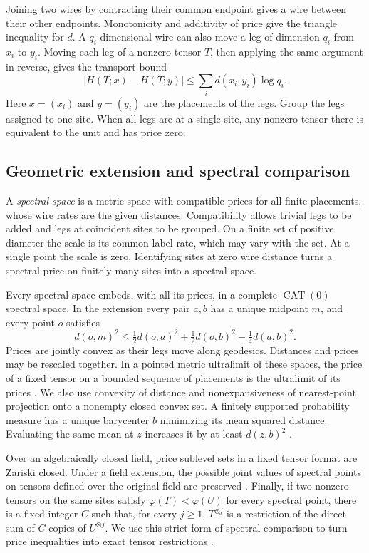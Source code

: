 Joining two wires by contracting their common endpoint gives a wire
between their other endpoints. Monotonicity and additivity of price
give the triangle inequality for \(d\). A \(q_i\)-dimensional wire
can also move a leg of dimension \(q_i\) from \(x_i\) to \(y_i\).
Moving each leg of a nonzero tensor \(T\), then applying the same
argument in reverse, gives the transport bound
\begin{equation}\label{eq:prices-transport}
       |H(T;x)-H(T;y)|\le\sum_i d(x_i,y_i)\log q_i .
\end{equation}
Here \(x=(x_i)\) and \(y=(y_i)\) are the placements of the legs. Group
the legs assigned to one site. When all legs are at a single site, any
nonzero tensor there is equivalent to the unit and has price zero.

\subsection{Geometric extension and spectral comparison}
A \emph{spectral space} is a metric space with compatible prices for
all finite placements, whose wire rates are the given distances.
Compatibility allows trivial legs to be added and legs at coincident
sites to be grouped. On a finite set of positive diameter the scale is
its common-label rate, which may vary with the set. At a single point the
scale is zero. Identifying sites at zero wire distance turns a spectral
price on finitely many sites into a spectral space.

Every spectral space embeds, with all its prices, in a complete
\(\operatorname{CAT}(0)\) spectral space. In the extension every pair
\(a,b\) has a unique midpoint \(m\), and every point \(o\) satisfies
\[
      d(o,m)^2\le \tfrac12 d(o,a)^2+\tfrac12 d(o,b)^2
                                      -\tfrac14 d(a,b)^2 .
\]
Prices are jointly convex as their legs move along geodesics. Distances
and prices may be rescaled together. In a pointed metric ultralimit
of these spaces, the price of a fixed tensor on a bounded sequence of
placements is the ultralimit of its prices
\citep[Sections~ and~,
Theorem~ and Proposition~]{oaG}.
We also use convexity of distance and nonexpansiveness of nearest-point
projection onto a nonempty closed convex set. A finitely supported
probability measure has a unique barycenter \(b\) minimizing its mean
squared distance. Evaluating the same mean at \(z\) increases it by at
least \(d(z,b)^2\) \citep{BridsonHaefliger,oaG}.

Over an algebraically closed field, price sublevel sets in a fixed tensor
format are Zariski closed. Under a field extension, the possible joint
values of spectral points on tensors defined over the original field
are preserved \citep[Section~]{oaG}.
Finally, if two nonzero tensors on the same sites satisfy
\(\varphi(T)<\varphi(U)\) for every spectral point, there is a fixed
integer \(C\) such that, for every \(j\ge1\), \(T^{\otimes j}\)
is a restriction of the direct sum of \(C\) copies of \(U^{\otimes j}\).
We use this strict form of spectral comparison to turn price inequalities
into exact tensor restrictions \citep[Lemma~]{oaG}.
